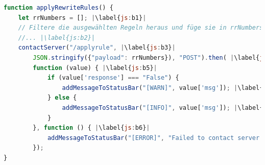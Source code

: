\begin{lstlisting}[language=JavaScript, escapechar=|, caption=Funktion \textit{applyRewriteRules()} aus der Datei \textit{index.js}, label={lst:apply}]
function applyRewriteRules() {
    let rrNumbers = []; |\label{js:b1}|
    // Filtere die ausgewählten Regeln heraus und füge sie in rrNumbers ein
    //... |\label{js:b2}|
    contactServer("/applyrule", |\label{js:b3}|
        JSON.stringify({"payload": rrNumbers}), "POST").then( |\label{js:b4}|
        function (value) { |\label{js:b5}|
            if (value['response'] === "False") {
                addMessageToStatusBar("[WARN]", value['msg']); |\label{js:b8}|
            } else {
                addMessageToStatusBar("[INFO]", value['msg']); |\label{js:b9}|
            }
        }, function () { |\label{js:b6}|
            addMessageToStatusBar("[ERROR]", "Failed to contact server."); |\label{js:b7}|
        }); 
}
\end{lstlisting} 
